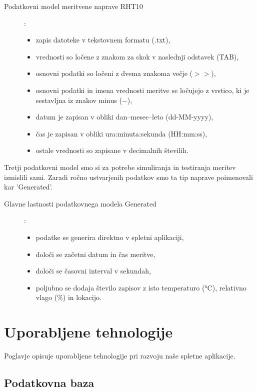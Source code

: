 \documentclass[a4paper, 12pt]{book}
\begin{document}
\begin{description}
\item[Podatkovni model meritvene naprave RHT10]:
\begin{itemize}
\item zapis datoteke v tekstovnem formatu (.txt),
\item vrednosti so ločene z znakom za skok v naslednji odstavek (TAB),
\item osnovni podatki so ločeni z dvema znakoma večje ($>>$),
\item osnovni podatki in imena vrednosti meritve se ločujejo z vrstico, ki je sestavljna iz znakov minus ($-$),
\item datum je zapisan v obliki dan--mesec--leto (dd-MM-yyyy),
\item čas je zapisan v obliki ura:minuta:sekunda (HH:mm:ss),
\item ostale vrednosti so zapisane v decimalnih številih.
\end{itemize}
\end{description}


\clearpage

\noindent Tretji podatkovni model smo si za potrebe simuliranja in testiranja meritev izmislili sami. Zaradi ročno ustvarjenih podatkov smo ta tip naprave poimenovali kar 'Generated'.


\begin{description}
\item[Glavne lastnosti podatkovnega modela Generated]:
\begin{itemize}
\item podatke se generira direktno v spletni aplikaciji,
\item določi se začetni datum in čas meritve,
\item določi se časovni interval v sekundah,
\item poljubno se dodaja število zapisov z isto temperaturo (°C), relativno vlago (\%) in lokacijo.
\end{itemize}
\end{description}

\chapter{Uporabljene tehnologije}
\label{uporabljene-tehnologije}

Poglavje opisuje uporabljene tehnologije pri razvoju naše spletne aplikacije.

\section{Podatkovna baza}
\end{document}
